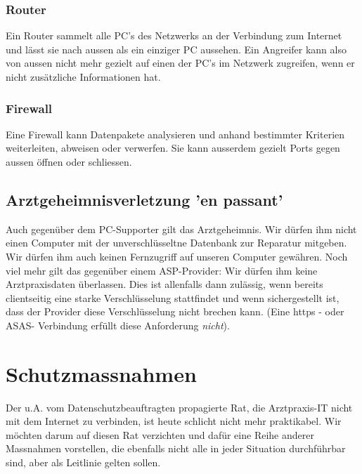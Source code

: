\documentclass[a4paper]{scrartcl}
\begin{document}
\subsubsection{Router}
Ein Router sammelt alle PC's des Netzwerks an der Verbindung zum Internet und lässt sie nach aussen als ein einziger PC aussehen. Ein Angreifer kann also von aussen nicht mehr gezielt auf einen der PC's im Netzwerk zugreifen, wenn er nicht zusätzliche Informationen hat.

\subsubsection{Firewall}
Eine Firewall kann Datenpakete analysieren und anhand bestimmter Kriterien weiterleiten, abweisen oder verwerfen. Sie kann ausserdem gezielt Ports gegen aussen öffnen oder schliessen.

\subsection{Arztgeheimnisverletzung 'en passant'}
Auch gegenüber dem PC-Supporter gilt das Arztgeheimnis. Wir dürfen ihm nicht einen Computer mit der unverschlüsseltne Datenbank zur Reparatur mitgeben. Wir dürfen ihm auch keinen Fernzugriff auf unseren Computer gewähren. Noch viel mehr gilt das gegenüber einem ASP-Provider: Wir dürfen ihm keine Arztpraxisdaten überlassen. Dies ist allenfalls dann zulässig, wenn bereits clientseitig eine starke Verschlüsselung stattfindet und wenn sichergestellt ist, dass der Provider diese Verschlüsselung nicht brechen kann. (Eine https - oder ASAS- Verbindung erfüllt diese Anforderung \textit{nicht}).

\section{Schutzmassnahmen}
Der u.A. vom Datenschutzbeauftragten propagierte Rat, die Arztpraxis-IT nicht mit dem Internet zu verbinden, ist heute schlicht nicht mehr praktikabel. Wir möchten darum auf diesen Rat verzichten und dafür eine Reihe anderer Massnahmen vorstellen, die ebenfalls nicht alle in jeder Situation durchführbar sind, aber als Leitlinie gelten sollen.
\end{document}

